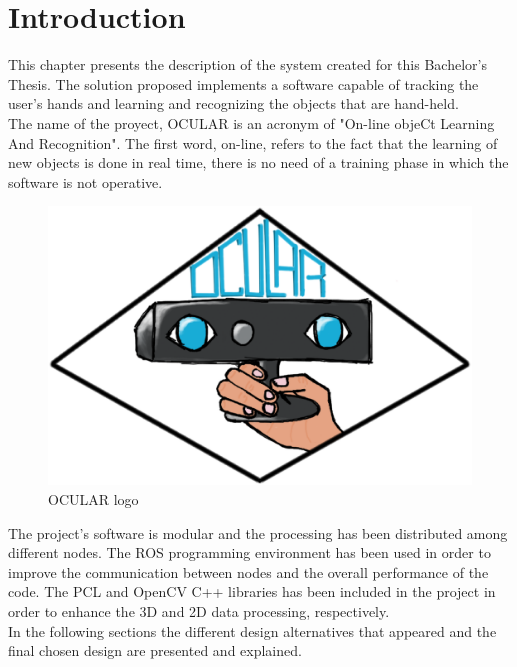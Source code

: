 \section{Introduction}

This chapter presents the description of the system created for this Bachelor's Thesis. The solution proposed implements a software capable of tracking the user's hands and learning and recognizing the objects that are hand-held. 
\\

The name of the proyect, OCULAR is an acronym of "On-line objeCt Learning And Recognition". The first word, on-line, refers to the fact that the learning of new objects is done in real time, there is no need of a training phase in which the software is not operative. 
\\

\begin{figure}[H]
	\begin{center}
\includegraphics[scale=0.3]{img/ocular_logo.eps}
	\caption[OCULAR Logo]{OCULAR logo}
	\end{center}
\end{figure}

The project's software is modular and the processing has been distributed among different nodes. The ROS programming environment has been used in order to improve the communication between nodes and the overall performance of the code. The PCL and OpenCV C++ libraries has been included in the project in order to enhance the 3D and 2D data processing, respectively. 
\\

In the following sections the different design alternatives that appeared and the final chosen design are presented and explained.
